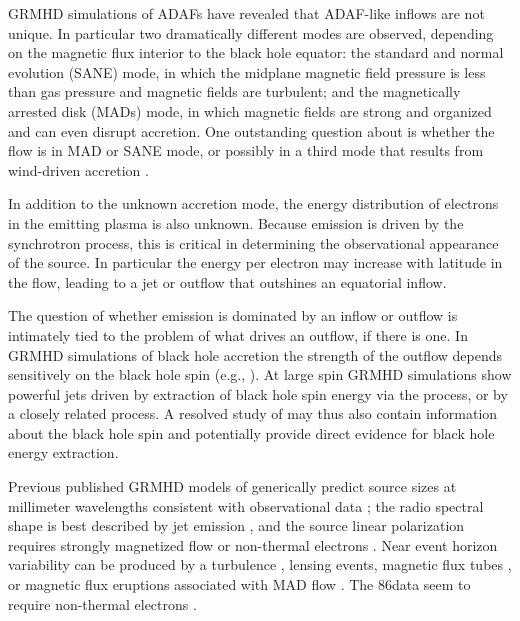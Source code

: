 GRMHD simulations of ADAFs have revealed that ADAF-like inflows are not unique. In particular two dramatically different modes are observed, depending on the magnetic flux interior to the black hole equator: the standard and normal evolution (SANE) mode, in which the midplane magnetic field pressure is less than gas pressure and magnetic fields are turbulent; and the magnetically arrested disk (MADs) mode, in which magnetic fields are strong and organized and can even disrupt accretion.  One outstanding question about \sgra is whether the flow is in MAD or SANE mode, or possibly in a third mode that results from wind-driven accretion \citep{2020ApJ...896L...6R}.

In addition to the unknown accretion mode, the energy distribution of electrons in the emitting plasma is also unknown.  Because emission is driven by the synchrotron process, this is critical in determining the observational appearance of the source.  In particular the energy per electron may increase with latitude in the flow, leading to a jet or outflow that outshines an equatorial inflow.

The question of whether emission is dominated by an inflow or outflow is intimately tied to the problem of what drives an outflow, if there is one.  In GRMHD simulations of black hole accretion the strength of the outflow depends sensitively on the black hole spin (e.g., ).  At large spin GRMHD simulations show powerful jets driven by extraction of black hole spin energy via the \citet{1977MNRAS.179..433B} process, or by a closely related process.  A resolved study of \sgra may thus also contain information about the black hole spin and potentially provide direct evidence for black hole energy extraction.

Previous published GRMHD models of \sgra generically predict source sizes at millimeter wavelengths consistent with observational data \citep[e.g.,][]{2008Natur.455...78D, 2009ApJ...706..497M, 2009ApJ...703L.142D};
the radio spectral shape is best described by jet emission \citep[e.g.,][]{2013A&A...559L...3M, 2017MNRAS.467.3604R}, and the source linear polarization requires strongly magnetized flow or non-thermal electrons \citep{2015Sci...350.1242J, 2017ApJ...837..180G, 2020MNRAS.494.4168D}.
Near event horizon variability can be produced by a turbulence \citep{2020MNRAS.497.4999D}, lensing events, magnetic flux tubes \citep{2015ApJ...812..103C}, or magnetic flux eruptions associated with MAD flow \citep{2011MNRAS.418L..79T}. The 86\GHz data seem to require non-thermal electrons \citep{2018MNRAS.478.5209C, 2019ApJ...871...30I}.

